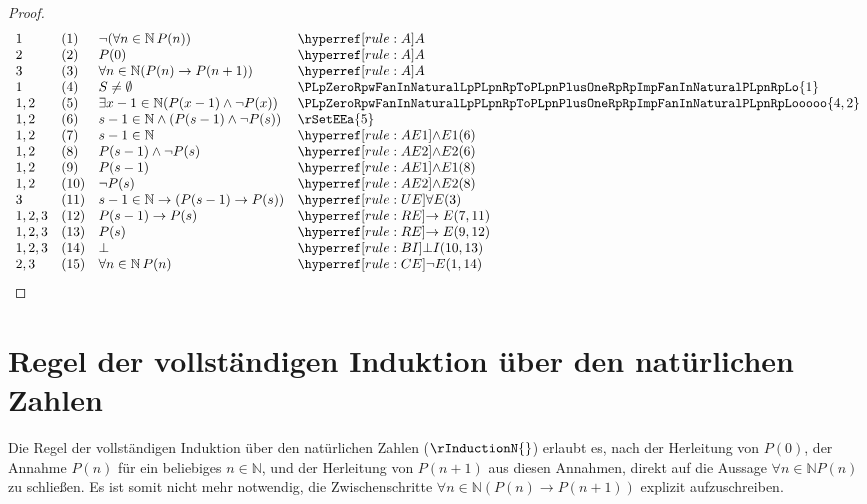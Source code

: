\documentclass[main.tex]{subfiles}
\begin{document}
\begin{proof}
	\[
	\begin{array}{llll}
		1 &  (1) & \neg (\forall n \in \mathbb{N} \, P(n)) & \rA \\
		2 &  (2) & P(0) & \rA \\			
		3 &  (3) & \forall n \in \mathbb{N}(P(n)\rightarrow P(n+1)) & \rA \\
		1 &  (4) & S\neq\emptyset & \PLpZeroRpwFanInNaturalLpPLpnRpToPLpnPlusOneRpRpImpFanInNaturalPLpnRpLo{1} \\	
            1,2 & (5) & \exists x-1\in\mathbb{N}(P(x-1)\land\neg P(x))& \PLpZeroRpwFanInNaturalLpPLpnRpToPLpnPlusOneRpRpImpFanInNaturalPLpnRpLooooo{4,2}  \\
            1,2 & (6) & s-1\in\mathbb{N}\land (P(s-1)\land\neg P(s))& \rSetEEa{5}  \\
            1,2 & (7) & s-1\in\mathbb{N}& \rAEa{6}  \\
            1,2 & (8) & P(s-1)\land\neg P(s)& \rAEb{6}  \\
            1,2 & (9) & P(s-1)& \rAEa{8}  \\
            1,2 & (10) & \neg P(s)& \rAEb{8}  \\
            3 & (11) & s-1\in\mathbb{N}\rightarrow (P(s-1)\rightarrow P(s))& \rUE{3}  \\
            1,2,3 & (12) & P(s-1)\rightarrow P(s)& \rRE{7,11}  \\
            1,2,3 & (13) & P(s)& \rRE{9,12}  \\
            1,2,3 & (14) & \bot & \rBI{10,13}  \\
            2,3 & (15) & \forall n \in \mathbb{N} \, P(n) & \rCE{1,14}  \\
	\end{array}
	\]
\end{proof}

\section{Regel der vollständigen Induktion über den natürlichen Zahlen}
\label{rule:rInductionN}

Die Regel der vollständigen Induktion über den natürlichen Zahlen (\(\rInductionN{}\)) erlaubt es, nach der Herleitung von \(P(0)\), der Annahme \(P(n)\) für ein beliebiges \(n \in \mathbb{N}\), und der Herleitung von \(P(n+1)\) aus diesen Annahmen, direkt auf die Aussage \(\forall n \in \mathbb{N} P(n)\) zu schließen. Es ist somit nicht mehr notwendig, die Zwischenschritte \(\forall n \in \mathbb{N} (P(n) \rightarrow P(n+1))\) explizit aufzuschreiben.
\end{document}
